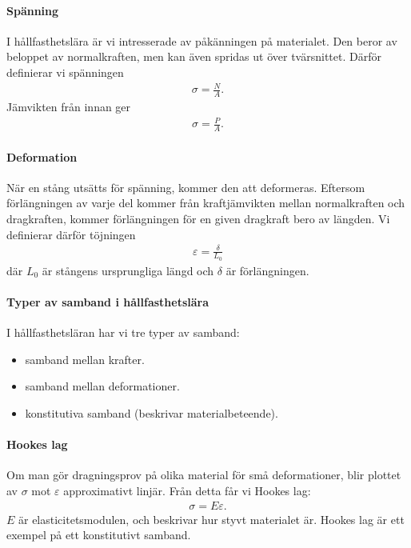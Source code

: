 \paragraph{Spänning}
I hållfasthetslära är vi intresserade av påkänningen på materialet. Den beror av beloppet av normalkraften, men kan även spridas ut över tvärsnittet. Därför definierar vi spänningen
\begin{align*}
	\sigma = \frac{N}{A}.
\end{align*}
Jämvikten från innan ger
\begin{align*}
	\sigma = \frac{P}{A}.
\end{align*}

\paragraph{Deformation}
När en stång utsätts för spänning, kommer den att deformeras. Eftersom förlängningen av varje del kommer från kraftjämvikten mellan normalkraften och dragkraften, kommer förlängningen för en given dragkraft bero av längden. Vi definierar därför töjningen
\begin{align*}
	\varepsilon	= \frac{\delta}{L_{0}}
\end{align*}
där $L_{0}$ är stångens ursprungliga längd och $\delta$ är förlängningen.

\paragraph{Typer av samband i hållfasthetslära}
I hållfasthetsläran har vi tre typer av samband:
\begin{itemize}
	\item samband mellan krafter.
	\item samband mellan deformationer.
	\item konstitutiva samband (beskrivar materialbeteende).
\end{itemize}

\paragraph{Hookes lag}
Om man gör dragningsprov på olika material för små deformationer, blir plottet av $\sigma$ mot $\varepsilon$ approximativt linjär. Från detta får vi Hookes lag:
\begin{align*}
	\sigma = E\varepsilon.
\end{align*}
$E$ är elasticitetsmodulen, och beskrivar hur styvt materialet är. Hookes lag är ett exempel på ett konstitutivt samband.

